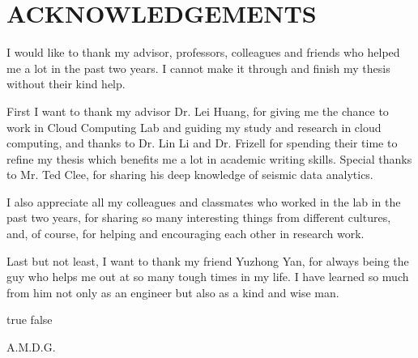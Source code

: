 %
%
%


\chapter*{ACKNOWLEDGEMENTS}

\thispagestyle{plain} %

I would like to thank my advisor, professors, colleagues and friends who helped me a lot in the past two years. I cannot make it through and finish my thesis without their kind help.

First I want to thank my advisor Dr. Lei Huang, for giving me the chance to work in Cloud Computing Lab and guiding my study and research in cloud computing, and thanks to Dr. Lin Li and Dr. Frizell for spending their time to refine my thesis which benefits me a lot in academic writing skills. Special thanks to Mr. Ted Clee, for sharing his deep knowledge of seismic data analytics.

I also appreciate all my colleagues and classmates who worked in the lab in the past two years, for sharing so many interesting things from different cultures, and, of course, for helping and encouraging each other in research work.

Last but not least, I want to thank my friend Yuzhong Yan, for always being the guy who helps me out at so many tough times in my life. I have learned so much from him not only as an engineer but also as a kind and wise man. 

\pagebreak{}

\ifx true false
\vspace*{\fill}
\begin{center}
A.M.D.G.
\end{center}
\vspace*{\fill}
\pagebreak{}
\fi
